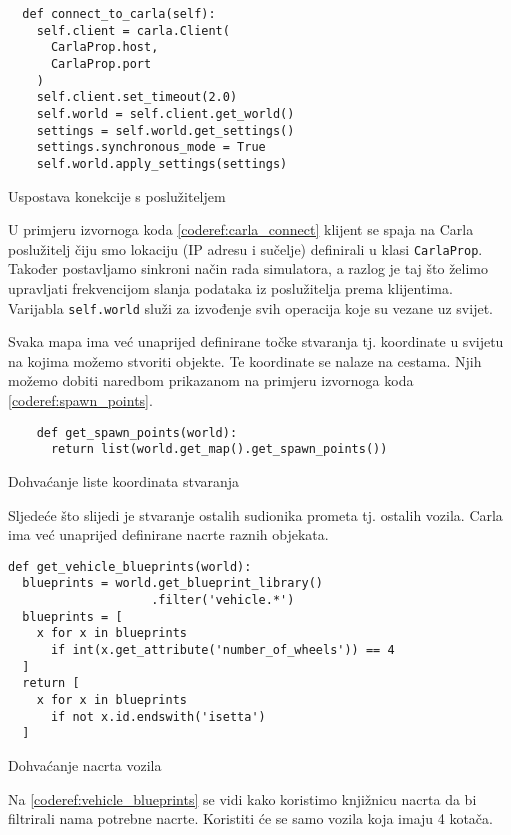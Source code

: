 \begin{listing}[h!]
  \begin{verbatim}
  def connect_to_carla(self):
    self.client = carla.Client(
      CarlaProp.host,
      CarlaProp.port
    )
    self.client.set_timeout(2.0)
    self.world = self.client.get_world()
    settings = self.world.get_settings()
    settings.synchronous_mode = True
    self.world.apply_settings(settings)
  \end{verbatim}
  \caption{Uspostava konekcije s poslužiteljem}
  \label{coderef:carla_connect}
\end{listing}

U primjeru izvornoga koda \ref{coderef:carla_connect} klijent se spaja na Carla poslužitelj čiju smo lokaciju (IP adresu i sučelje) definirali u klasi \texttt{CarlaProp}. Također postavljamo sinkroni način rada simulatora, a razlog je taj što želimo upravljati frekvencijom slanja podataka iz poslužitelja prema klijentima. Varijabla \texttt{self.world} služi za izvođenje svih operacija koje su vezane uz svijet.

Svaka mapa ima već unaprijed definirane točke stvaranja tj. koordinate u svijetu na kojima možemo stvoriti objekte. Te koordinate se nalaze na cestama. Njih možemo dobiti naredbom prikazanom na primjeru izvornoga koda \ref{coderef:spawn_points}. 

\begin{listing}[h!]
  \begin{verbatim}
    def get_spawn_points(world):
      return list(world.get_map().get_spawn_points())
  \end{verbatim}
  \caption{Dohvaćanje liste koordinata stvaranja}
  \label{coderef:spawn_points}
\end{listing}

Sljedeće što slijedi je stvaranje ostalih sudionika prometa tj. ostalih vozila. Carla ima već unaprijed definirane nacrte raznih objekata.

\begin{listing}[h!]
  \begin{verbatim}
def get_vehicle_blueprints(world):
  blueprints = world.get_blueprint_library()
                    .filter('vehicle.*')
  blueprints = [
    x for x in blueprints
      if int(x.get_attribute('number_of_wheels')) == 4
  ]
  return [
    x for x in blueprints
      if not x.id.endswith('isetta')
  ]
  \end{verbatim}
  \caption{Dohvaćanje nacrta vozila}
  \label{coderef:vehicle_blueprints}
\end{listing}
\pagebreak
Na \ref{coderef:vehicle_blueprints} se vidi kako koristimo knjižnicu nacrta da bi filtrirali nama potrebne nacrte. Koristiti će se samo vozila koja imaju 4 kotača.

